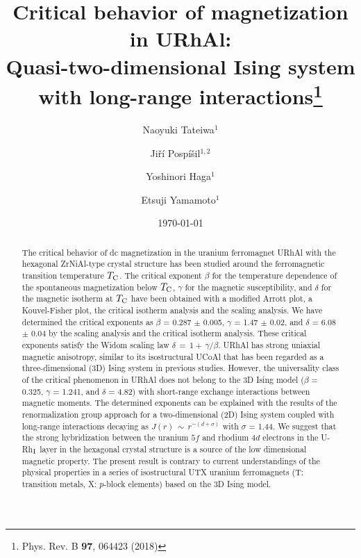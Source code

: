 \documentclass[twocolumn,showpacs,preprintnumbers,amsmath,amssymb]{revtex4}
\begin{document}


\title{Critical behavior of magnetization in URhAl:\\Quasi-two-dimensional Ising system with long-range interactions\footnote{Phys. Rev. B {\bf 97}, 064423 (2018)}}

\author{Naoyuki Tateiwa$^{1}$}
\author{Ji\v{r}{\'i} Posp{\'i}\v{s}il$^{1,2}$}
\author{Yoshinori Haga$^{1}$}%
\author{Etsuji Yamamoto$^{1}$}%


\date{\today}%

\begin{abstract}
 The critical behavior of dc magnetization in the uranium ferromagnet URhAl with the hexagonal ZrNiAl-type crystal structure has been studied around the ferromagnetic transition temperature $T_{\rm C}$. The critical exponent $\beta$ for the temperature dependence of the spontaneous magnetization below $T_{\rm C}$, $\gamma$ for the magnetic susceptibility, and $\delta$ for the magnetic isotherm at $T_{\rm C}$ have been obtained with a modified Arrott plot, a Kouvel-Fisher plot, the critical isotherm analysis and the scaling analysis. We have determined the critical exponents as $\beta$ = 0.287 $\pm$ 0.005, $\gamma$ = 1.47 $\pm$ 0.02, and $\delta$ = 6.08 $\pm$ 0.04 by the scaling analysis and the critical isotherm analysis. These critical exponents satisfy the Widom scaling law ${\delta}{\,}={\,}1+{\,}{\gamma}/{\beta}$. URhAl has strong uniaxial magnetic anisotropy, similar to its isostructural UCoAl that has been regarded as a three-dimensional (3D) Ising system in previous studies. However, the universality class of the critical phenomenon in URhAl does not belong to the 3D Ising model ($\beta$ = 0.325, $\gamma$ = 1.241, and $\delta$ = 4.82) with short-range exchange interactions between magnetic moments. The determined exponents can be explained with the results of the renormalization group approach for a two-dimensional (2D) Ising system coupled with long-range interactions decaying as $J(r){\,}{\sim}{\,}r^{-(d+{\sigma})}$ with $\sigma$ = 1.44. We suggest that the strong hybridization between the uranium $5f$ and rhodium $4d$ electrons in the U-Rh$_{\rm I}$ layer in the hexagonal crystal structure is a source of the low dimensional magnetic property. The present result is contrary to current understandings of the physical properties in a series of isostructural UTX uranium ferromagnets (T: transition metals, X: $p$-block elements) based on the 3D Ising model. 
 \end{abstract}
\end{document}
